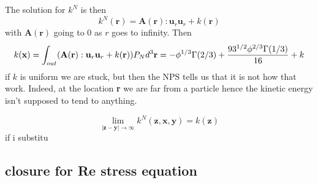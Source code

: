 The solution for $k^N$ is then 
\begin{equation}
    k^N(\textbf{r})
    = 
    \textbf{A}(\textbf{r}): \textbf{u}_r \textbf{u}_r 
    + k(\textbf{r})
\end{equation}
with $\textbf{A}(\textbf{r})$ going to 0 as $r$ goes to infinity. 
Then 
\begin{equation}
    k(\textbf{x}) = \int_{out}
    (\textbf{A}(\textbf{r}): \textbf{u}_r \textbf{u}_r 
    + k(\textbf{r})) P_N d^3\textbf{r}\\
    =
    -\phi^{1/3} \Gamma(2/3)
    + \frac{9 3^{1/2} \phi^{2/3} \Gamma(1/3)  }{16}
    + k 
\end{equation}
if $k$ is uniform we are stuck, but then the NPS tells us that it is not how that work. 
Indeed, at the location \textbf{r} we are far from a particle hence the kinetic energy isn't supposed to tend to anything. 

\begin{equation}
    \lim_{|\textbf{z}- \textbf{y}|\to\infty }k^N(\textbf{z},\textbf{x},\textbf{y})= k(\textbf{z})
\end{equation}
if i substitu


\subsection{closure for Re stress equation}

